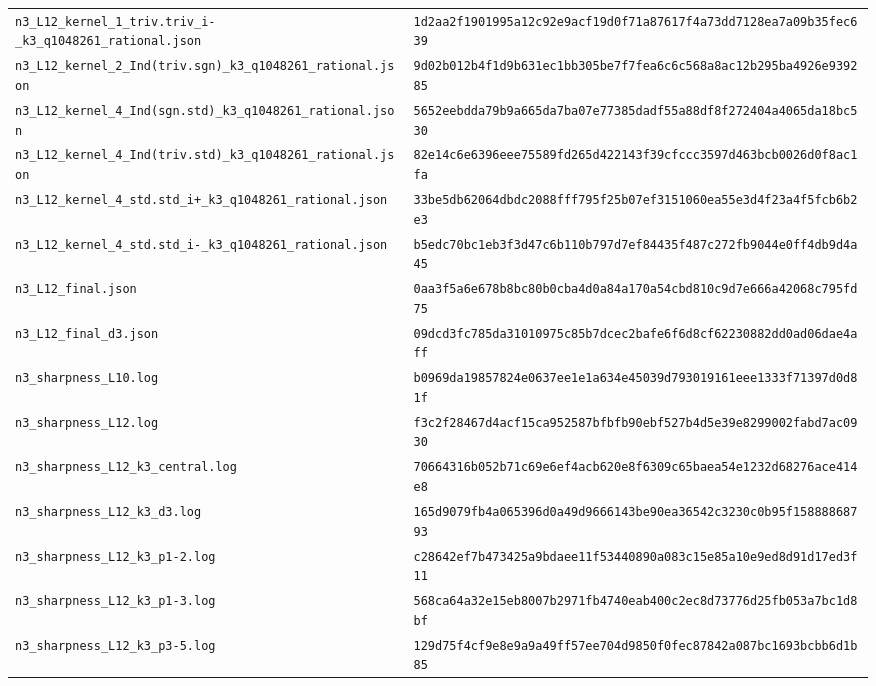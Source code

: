 \documentclass[aps,prx,reprint,superscriptaddress,nobibnotes,longbibliography]{revtex4-2}
\begin{document}
\begin{table}[t]
\begin{ruledtabular}
\begin{tabular}{ll}
\texttt{n3\_L12\_kernel\_1\_triv.triv\_i-\_k3\_q1048261\_rational.json} & \texttt{\scriptsize 1d2aa2f1901995a12c92e9acf19d0f71a87617f4a73dd7128ea7a09b35fec639}\\
\texttt{n3\_L12\_kernel\_2\_Ind(triv.sgn)\_k3\_q1048261\_rational.json} & \texttt{\scriptsize 9d02b012b4f1d9b631ec1bb305be7f7fea6c6c568a8ac12b295ba4926e939285}\\
\texttt{n3\_L12\_kernel\_4\_Ind(sgn.std)\_k3\_q1048261\_rational.json} & \texttt{\scriptsize 5652eebdda79b9a665da7ba07e77385dadf55a88df8f272404a4065da18bc530}\\
\texttt{n3\_L12\_kernel\_4\_Ind(triv.std)\_k3\_q1048261\_rational.json} & \texttt{\scriptsize 82e14c6e6396eee75589fd265d422143f39cfccc3597d463bcb0026d0f8ac1fa}\\
\texttt{n3\_L12\_kernel\_4\_std.std\_i+\_k3\_q1048261\_rational.json} & \texttt{\scriptsize 33be5db62064dbdc2088fff795f25b07ef3151060ea55e3d4f23a4f5fcb6b2e3}\\
\texttt{n3\_L12\_kernel\_4\_std.std\_i-\_k3\_q1048261\_rational.json} & \texttt{\scriptsize b5edc70bc1eb3f3d47c6b110b797d7ef84435f487c272fb9044e0ff4db9d4a45}\\
\texttt{n3\_L12\_final.json} & \texttt{\scriptsize 0aa3f5a6e678b8bc80b0cba4d0a84a170a54cbd810c9d7e666a42068c795fd75}\\
\texttt{n3\_L12\_final\_d3.json} & \texttt{\scriptsize 09dcd3fc785da31010975c85b7dcec2bafe6f6d8cf62230882dd0ad06dae4aff}\\
\texttt{n3\_sharpness\_L10.log} & \texttt{\scriptsize b0969da19857824e0637ee1e1a634e45039d793019161eee1333f71397d0d81f}\\
\texttt{n3\_sharpness\_L12.log} & \texttt{\scriptsize f3c2f28467d4acf15ca952587bfbfb90ebf527b4d5e39e8299002fabd7ac0930}\\
\texttt{n3\_sharpness\_L12\_k3\_central.log} & \texttt{\scriptsize 70664316b052b71c69e6ef4acb620e8f6309c65baea54e1232d68276ace414e8}\\
\texttt{n3\_sharpness\_L12\_k3\_d3.log} & \texttt{\scriptsize 165d9079fb4a065396d0a49d9666143be90ea36542c3230c0b95f15888868793}\\
\texttt{n3\_sharpness\_L12\_k3\_p1-2.log} & \texttt{\scriptsize c28642ef7b473425a9bdaee11f53440890a083c15e85a10e9ed8d91d17ed3f11}\\
\texttt{n3\_sharpness\_L12\_k3\_p1-3.log} & \texttt{\scriptsize 568ca64a32e15eb8007b2971fb4740eab400c2ec8d73776d25fb053a7bc1d8bf}\\
\texttt{n3\_sharpness\_L12\_k3\_p3-5.log} & \texttt{\scriptsize 129d75f4cf9e8e9a9a49ff57ee704d9850f0fec87842a087bc1693bcbb6d1b85}\\

\end{tabular}
\end{ruledtabular}
\end{table}
\end{document}
